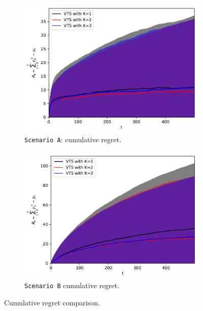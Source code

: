 \documentclass{article}
\begin{document}
\begin{figure}[!h]
	\centering
	\begin{subfigure}[b]{0.48\textwidth}
		\includegraphics[width=\textwidth]{./figs/model_a_cumregret.pdf}
		\caption{\texttt{Scenario A}: cumulative regret.}
		\label{fig:model_a_cumregret}
	\end{subfigure}
	\begin{subfigure}[b]{0.49\textwidth}
		\includegraphics[width=\textwidth]{./figs/model_b_cumregret.pdf}
		\caption{\texttt{Scenario B} cumulative regret.}
		\label{fig:model_b_cumregret}
	\end{subfigure}%
	\caption{Cumulative regret comparison.}
	\label{fig:cumregret_comparison}
\end{figure}
\end{document}
